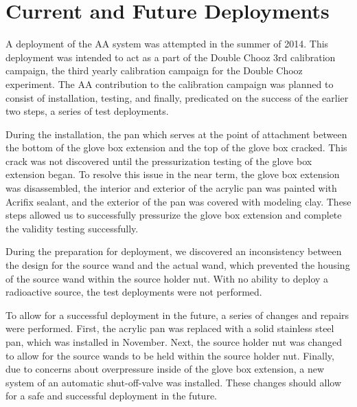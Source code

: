 \section{Current and Future Deployments}
\label{sec:Deployment}
  A deployment of the AA system was attempted in the summer of 2014. This deployment was intended to act as a part of the Double Chooz 3rd calibration campaign, the third yearly calibration campaign for the Double Chooz experiment. The AA contribution to the calibration campaign was planned to consist of installation, testing, and finally, predicated on the success of the earlier two steps, a series of test deployments. 
  
 During the installation, the pan which serves at the point of attachment between the bottom of the glove box extension and the top of the glove box cracked. This crack was not discovered until the pressurization testing of the glove box extension began. To resolve this issue in the near term, the glove box extension was disassembled, the interior and exterior of the acrylic pan was painted with Acrifix sealant, and the exterior of the pan was covered with modeling clay. These steps allowed us to successfully pressurize the glove box extension and complete the validity testing successfully. 
 
During the preparation for deployment, we discovered an inconsistency between the design for the source wand and the actual wand, which prevented the housing of the source wand within the source holder nut. With no ability to deploy a radioactive source, the test deployments were not performed. 

To allow for a successful deployment in the future, a series of changes and repairs were performed. First, the acrylic pan was replaced with a solid stainless steel pan, which was installed in November. Next, the source holder nut was changed to allow for the source wands to be held within the source holder nut. Finally, due to concerns about overpressure inside of the glove box extension, a new system of an automatic shut-off-valve was installed. These changes should allow for a safe and successful deployment in the future. 


